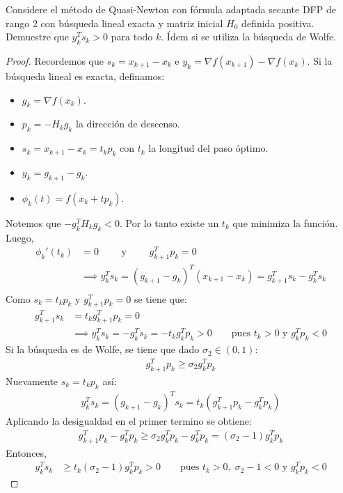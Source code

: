 \documentclass{article}
\newenvironment{theorem}[2][Ejercicio]{\begin{trivlist}
\item[\hskip \labelsep {\bfseries #1}\hskip \labelsep {\bfseries #2.}]}{\end{trivlist}}
\begin{document}
\begin{theorem}{9}
    Considere el método de Quasi-Newton con fórmula adaptada secante DFP de rango 2
    con búsqueda lineal exacta y matriz inicial \(H_0\) definida positiva.
    Demuestre que \(y_k^T s_k > 0\) para todo \(k\).
    Ídem si se utiliza la búsqueda de Wolfe.
\end{theorem}

\begin{proof}
    Recordemos que \( s_k = x_{k+1} - x_k \) e \( y_k = \nabla f(x_{k+1}) - \nabla f(x_k) \). Si la búsqueda lineal es exacta, definamos: \begin{itemize}
        \item \( g_k = \nabla f(x_k) \).
        \item \( p_k = - H_k g_k \) la dirección de descenso.
        \item \( s_k = x_{k+1} - x_k = t_k p_k \) con \( t_k \) la longitud del paso óptimo.
        \item \( y_k = g_{k+1} - g_k \).
        \item \( \phi_k(t) = f(x_k + t p_k) \).
    \end{itemize}
    Notemos que \( -g_k^T H_k g_k < 0 \). Por lo tanto existe un \( t_k \) que minimiza la función. Luego, \begin{align*}
        \phi_k'(t_k) & = 0 \qquad \text{ y } \qquad g_{k+1}^T p_k = 0                                       \\
                     & \implies y_k^T s_k = {(g_{k+1} - g_k)}^T (x_{k+1} - x_k) = g_{k+1}^T s_k - g_k^T s_k \\
    \end{align*}
    Como \( s_k = t_k p_k \) y \( g_{k+1}^T p_k = 0 \) se tiene que: \begin{align*}
        g_{k+1}^T s_k & = t_k g_{k+1}^T p_k = 0                                                                                     \\
                      & \implies y_k^T s_k = - g_k^T s_k = - t_k g_k^T p_k > 0 \qquad \text{pues } t_k > 0 \text{ y } g_k^T p_k < 0
    \end{align*}
    Si la búsqueda es de Wolfe, se tiene que dado \( \sigma_2 \in (0, 1) \): \begin{align*}
        g_{k+1}^T p_k \geq \sigma_2 g_k^T p_k
    \end{align*}
    Nuevamente \( s_k = t_k p_k \) así: \begin{align*}
        y_k^T s_k = {(g_{k+1} - g_k)}^T  s_k = t_k (g_{k+1}^T p_k - g_k^T p_k)
    \end{align*}
    Aplicando la desigualdad en el primer termino se obtiene: \begin{align*}
        g_{k+1}^T p_k - g_k^T p_k \geq \sigma_2 g_k^T p_k - g_k^T p_k = (\sigma_2 - 1) g_k^T p_k
    \end{align*}
    Entonces, \begin{align*}
        y_k^T s_k & \geq t_k (\sigma_2 - 1) g_k^T p_k > 0 \qquad \text{pues } t_k > 0, \; \sigma_2 - 1 < 0 \text{ y } g_k^T p_k < 0
    \end{align*}
\end{proof}

\vspace{0.25in}
\end{document}

